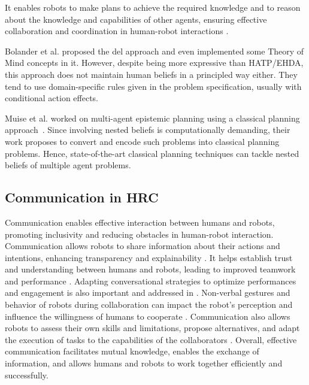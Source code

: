     It enables robots to make plans to achieve the required knowledge and to reason about the knowledge and capabilities of other agents, ensuring effective collaboration and coordination in human-robot interactions \cite{belle_epistemic_2023}.

    Bolander et al. proposed the \acrfull{del} approach \cite{bolander_gentle_2017} and even implemented some Theory of Mind concepts in it. However, despite being more expressive than HATP/EHDA, this approach does not maintain human beliefs in a principled way either. They tend to use domain-specific rules given in the problem specification, usually with conditional action effects. 

    Muise et al. worked on multi-agent epistemic planning using a classical planning approach~\cite{muise_planning_2015}. Since involving nested beliefs is computationally demanding, their work proposes to convert and encode such problems into classical planning problems. Hence, state-of-the-art classical planning techniques can tackle nested beliefs of multiple agent problems. 

    
    \subsection{Communication in HRC}

    Communication enables effective interaction between humans and robots, promoting inclusivity and reducing obstacles in human-robot interaction. Communication allows robots to share information about their actions and intentions, enhancing transparency and explainability \cite{mcmillan_human-robot_2023}. It helps establish trust and understanding between humans and robots, leading to improved teamwork and performance \cite{verhagen_influence_2022}. 
    Adapting conversational strategies to optimize performances and engagement is also important and addressed in \cite{galland_adapting_2022}.
    Non-verbal gestures and behavior of robots during collaboration can impact the robot's perception and influence the willingness of humans to cooperate \cite{arntz_collaborating_2022}. Communication also allows robots to assess their own skills and limitations, propose alternatives, and adapt the execution of tasks to the capabilities of the collaborators \cite{ferrari_bidirectional_2022}. Overall, effective communication facilitates mutual knowledge, enables the exchange of information, and allows humans and robots to work together efficiently and successfully.


